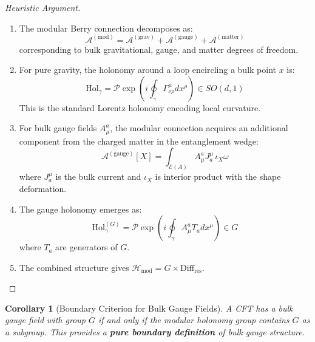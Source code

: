 \documentclass[12pt,a4paper]{article}
\newtheorem{corollary}[theorem]{Corollary}
\begin{document}
\begin{proof}[Heuristic Argument]
\begin{enumerate}
    \item The modular Berry connection decomposes as:
    \begin{equation}
    \mathcal{A}^{(\text{mod})} = \mathcal{A}^{(\text{grav})} + \mathcal{A}^{(\text{gauge})} + \mathcal{A}^{(\text{matter})}
    \end{equation}
    corresponding to bulk gravitational, gauge, and matter degrees of freedom.
    
    \item For pure gravity, the holonomy around a loop encircling a bulk point $x$ is:
    \begin{equation}
    \text{Hol}_\gamma = \mathcal{P} \exp\left( i \oint_\gamma \Gamma^\mu_{\nu\rho} dx^\rho \right) \in SO(d,1)
    \end{equation}
    This is the standard Lorentz holonomy encoding local curvature.
    
    \item For bulk gauge fields $A_\mu^a$, the modular connection acquires an additional component from the charged matter in the entanglement wedge:
    \begin{equation}
    \mathcal{A}^{(\text{gauge})}[X] = \int_{\mathcal{E}(A)} A_\mu^a J^\mu_a \, \iota_X \omega
    \end{equation}
    where $J^\mu_a$ is the bulk current and $\iota_X$ is interior product with the shape deformation.
    
    \item The gauge holonomy emerges as:
    \begin{equation}
    \text{Hol}_\gamma^{(G)} = \mathcal{P} \exp\left( i \oint_\gamma A_\mu^a T_a dx^\mu \right) \in G
    \end{equation}
    where $T_a$ are generators of $G$.
    
    \item The combined structure gives $\mathcal{H}_{\text{mod}} = G \times \text{Diff}_{\text{res}}$.
\end{enumerate}
\end{proof}

\begin{corollary}[Boundary Criterion for Bulk Gauge Fields]
A CFT has a bulk gauge field with group $G$ if and only if the modular holonomy group contains $G$ as a subgroup. This provides a \textbf{pure boundary definition} of bulk gauge structure.
\end{corollary}
\end{document}
